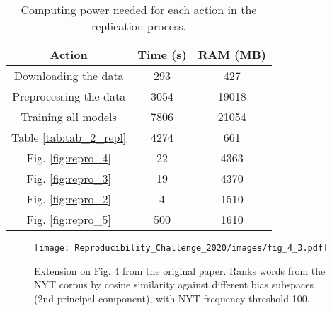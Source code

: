 \begin{table}[ht]
    \centering
    \caption{Computing power needed for each action in the replication process.}
    \begin{tabular}{c|c|c}
      Action & Time (s) & RAM (MB) \\ 
      \hline
      Downloading the data & 293 & 427 \\
      Preprocessing the data & 3054 & 19018 \\
      Training all models & 7806 & 21054 \\
      Table \ref{tab:tab_2_repl} & 4274 & 661 \\
      Fig. \ref{fig:repro_4} & 22 & 4363 \\
      Fig. \ref{fig:repro_3} & 19 & 4370 \\
      Fig. \ref{fig:repro_2} & 4 & 1510 \\
      Fig. \ref{fig:repro_5} & 500 & 1610 \\
    \end{tabular}
    \label{tab:compute}
\end{table}

\begin{figure}[ht]
    \centering
    \texttt{[image: Reproducibility\_Challenge\_2020/images/fig\_4\_3.pdf]}
    \caption{Extension on Fig. 4 from the original paper. Ranks words from the NYT corpus by cosine
    similarity against different bias subspaces (2nd principal component), with NYT frequency
  threshold 100. }
     \label{fig:repro_4_3}
\end{figure}

